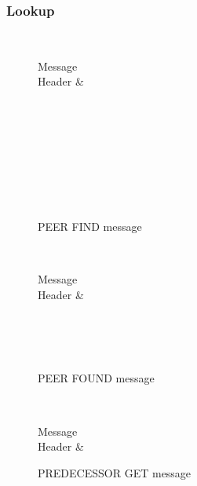 \documentclass[a4paper, 11pt]{article}
\begin{document}
\subsubsection*{Lookup}

\begin{figure}[H]
	\centering
	\begin{bytefield}[bitwidth=0.8em]{32}
		 \\
		\begin{rightwordgroup}{Message \\  Header}
			 & 
		\end{rightwordgroup} \\
		 \\
		\skippedwords \\
		 \\
		 \\
		\skippedwords \\
		 \\
	\end{bytefield}
	\caption{PEER FIND message}
	\label{PEERFIND}
\end{figure}

\begin{figure}[H]
	\centering
	\begin{bytefield}[bitwidth=0.8em]{32}
		 \\
		\begin{rightwordgroup}{Message \\  Header}
			 & 
		\end{rightwordgroup} \\
		 \\
		\skippedwords \\
	\end{bytefield}
	\caption{PEER FOUND message}
	\label{PEERFOUND}
\end{figure}

\begin{figure}[H]
	\centering
	\begin{bytefield}[bitwidth=0.8em]{32}
		 \\
		\begin{rightwordgroup}{Message \\  Header}
			 & 
		\end{rightwordgroup}
	\end{bytefield}
	\caption{PREDECESSOR GET message}
	\label{PREDECESSORGET}
\end{figure}
\end{document}
